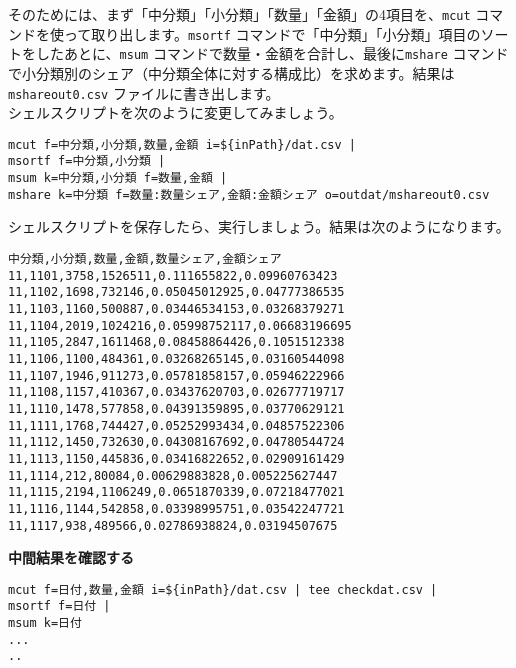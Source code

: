 そのためには、まず「中分類」「小分類」「数量」「金額」の4項目を、\verb|mcut| コマンドを使って取り出します。\verb|msortf| コマンドで「中分類」「小分類」項目のソートをしたあとに、\verb|msum| コマンドで数量・金額を合計し、最後に\verb|mshare| コマンドで小分類別のシェア（中分類全体に対する構成比）を求めます。結果は \verb|mshareout0.csv| ファイルに書き出します。\\

シェルスクリプトを次のように変更してみましょう。\\

\begin{verbatim}
mcut f=中分類,小分類,数量,金額 i=${inPath}/dat.csv |
msortf f=中分類,小分類 |
msum k=中分類,小分類 f=数量,金額 |
mshare k=中分類 f=数量:数量シェア,金額:金額シェア o=outdat/mshareout0.csv
\end{verbatim}

シェルスクリプトを保存したら、実行しましょう。結果は次のようになります。

\begin{verbatim}
中分類,小分類,数量,金額,数量シェア,金額シェア
11,1101,3758,1526511,0.111655822,0.09960763423
11,1102,1698,732146,0.05045012925,0.04777386535
11,1103,1160,500887,0.03446534153,0.03268379271
11,1104,2019,1024216,0.05998752117,0.06683196695
11,1105,2847,1611468,0.08458864426,0.1051512338
11,1106,1100,484361,0.03268265145,0.03160544098
11,1107,1946,911273,0.05781858157,0.05946222966
11,1108,1157,410367,0.03437620703,0.02677719717
11,1110,1478,577858,0.04391359895,0.03770629121
11,1111,1768,744427,0.05252993434,0.04857522306
11,1112,1450,732630,0.04308167692,0.04780544724
11,1113,1150,445836,0.03416822652,0.02909161429
11,1114,212,80084,0.00629883828,0.005225627447
11,1115,2194,1106249,0.0651870339,0.07218477021
11,1116,1144,542858,0.03398995751,0.03542247721
11,1117,938,489566,0.02786938824,0.03194507675
\end{verbatim}

\vspace {5mm}

{\setlength{\parindent}{0cm}

\textbf{中間結果を確認する}\\

}
\begin{verbatim}
mcut f=日付,数量,金額 i=${inPath}/dat.csv | tee checkdat.csv |
msortf f=日付 |
msum k=日付
...
..         
\end{verbatim}

